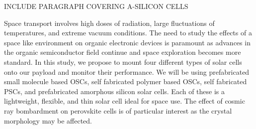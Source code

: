 INCLUDE PARAGRAPH COVERING A-SILICON CELLS

	Space transport involves high doses of radiation, large fluctuations of temperatures, and extreme vacuum conditions. The need to study the effects of a space like environment on organic electronic devices is paramount as advances in the organic semiconductor field continue and space exploration becomes more standard. In this study, we propose to mount four different types of solar cells onto our payload and monitor their performance. We will be using prefabricated small molecule based OSCs, self fabricated polymer based OSCs, self fabricated PSCs, and prefabricated amorphous silicon solar cells. Each of these is a lightweight, flexible, and thin solar cell ideal for space use. The effect of cosmic ray bombardment on perovskite cells is of particular interest as the crystal morphology may be affected.  
    









